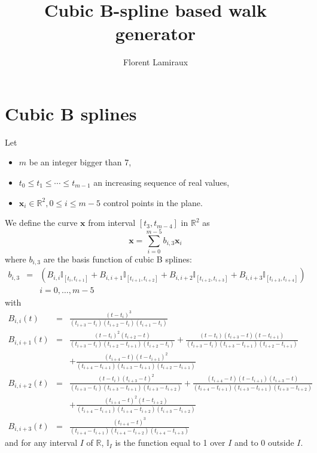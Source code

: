 \documentclass {article}
\title {Cubic B-spline based walk generator}
\author {Florent Lamiraux}
\newcommand\real{\mathbb{R}}
\newcommand\x{\mathbf{x}}
\begin{document}
\maketitle

\section {Cubic B splines}

Let
\begin{itemize}
\item $m$ be an integer bigger than 7,
\item $t_0 \leq t_1 \leq \cdots \leq t_{m-1}$ an increasing sequence
  of real values,
\item $\x_{i} \in \real^2, 0\leq i \leq m-5$ control points in the
  plane.
\end{itemize}
We define the curve $\x$ from interval $[t_3, t_{m-4}]$ in $\real^2$ as
\begin{equation}\label{eq:com-1}
  \x = \sum_{i=0}^{m-5}b_{i,3}\x_i
\end{equation}\label{eq:b-spline}
where $b_{i,3}$ are the basis function of cubic B splines:
\begin{eqnarray*}
b_{i,3} &=& (B_{i, i} \mathbb{I}_{[t_i, t_{i+1}]} + B_{i,i+1} \mathbb{I}_{[t_{i+1}, t_{i+2}]} +B_{i,i+2} \mathbb{I}_{[t_{i+2}, t_{i+3}]}+B_{i,i+3} \mathbb{I}_{[t_{i+3}, t_{i+4}]})\\
&&i=0,\ldots, m-5
\end{eqnarray*}
with
\begin{eqnarray*}
B_{i, i} (t) &=& \frac{(t - t_i)^3}{(t_{i+3} - t_i)(t_{i+2} - t_i)(t_{i+1} - t_i)} \\
B_{i,i+1} (t) &=& \frac{(t - t_i)^2(t_{i+2} - t)}{(t_{i+3} - t_i)(t_{i+2} - t_{i+1})(t_{i+2} - t_i)}+\frac{(t - t_i)(t_{i+3} - t)(t - t_{i+1})}{(t_{i+3} - t_i)(t_{i+3} - t_{i+1})(t_{i+2} - t_{i+1})}\\
&&+\frac{(t_{i+4} - t)(t - t_{i+1})^2}{(t_{i+4} - t_{i+1})(t_{i+3} - t_{i+1})(t_{i+2} - t_{i+1})} \\
B_{i,i+2} (t) &=& \frac{(t - t_i)(t_{i+3} - t)^2}{(t_{i+3} - t_i)(t_{i+3} - t_{i+1})(t_{i+3} - t_{i+2})}+\frac{(t_{i+4} - t)(t - t_{i+1})(t_{i+3} - t)}{(t_{i+4} - t_{i+1})(t_{i+3} - t_{i+1})(t_{i+3} - t_{i+2})}\\
&&+\frac{(t_{i+4} - t)^2(t - t_{i+2})}{(t_{i+4} - t_{i+1})(t_{i+4} - t_{i+2})(t_{i+3} - t_{i+2})}\\
B_{i,i+3} (t) &=& \frac{(t_{i+4} - t)^3}{(t_{i+4} - t_{i+1})(t_{i+4} - t_{i+2})(t_{i+4} - t_{i+3})}
\end{eqnarray*}
and for any interval $I$ of $\real$, $\mathbb{I}_{I}$ is the function equal to
1 over $I$ and to $0$ outside $I$.
\end{document}
